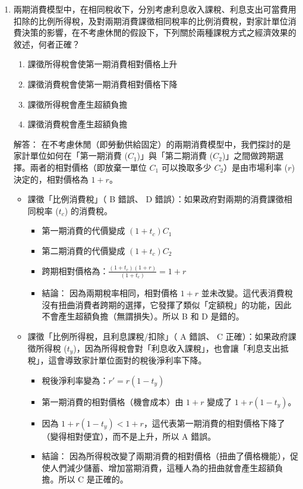 \documentclass[12pt, a4paper]{article}
\begin{document}
\begin{enumerate}
    \item 兩期消費模型中，在相同稅收下，分別考慮利息收入課稅、利息支出可當費用扣除的比例所得稅，及對兩期消費課徵相同稅率的比例消費稅，對家計單位消費決策的影響，在不考慮休閒的假設下，下列關於兩種課稅方式之經濟效果的敘述，何者正確？
    \begin{enumerate}[label=\Alph*.]
        \item 課徵所得稅會使第一期消費相對價格上升
        \item 課徵消費稅會使第一期消費相對價格下降
        \item 課徵所得稅會產生超額負擔
        \item 課徵消費稅會產生超額負擔
    \end{enumerate}
    解答：
    在不考慮休閒（即勞動供給固定）的兩期消費模型中，我們探討的是家計單位如何在「第一期消費 (\(C_1\))」與「第二期消費 (\(C_2\))」之間做跨期選擇。兩者的相對價格（即放棄一單位 \(C_1\) 可以換取多少 \(C_2\)）是由市場利率 (\(r\)) 決定的，相對價格為 \(1 + r\)。
    \begin{itemize}
        \item 課徵「比例消費稅」（ B 錯誤、 D 錯誤）：如果政府對兩期的消費課徵相同稅率 (\(t_c\)) 的消費稅。
        \begin{itemize}
            \item 第一期消費的代價變成 \((1+t_c)C_1\)
            \item 第二期消費的代價變成 \((1+t_c)C_2\)
            \item 跨期相對價格為：\(\frac{(1+t_c)(1+r)}{(1+t_c)} = 1+r\)
            \item 結論： 因為兩期稅率相同，相對價格 \(1+r\) 並未改變。這代表消費稅沒有扭曲消費者跨期的選擇，它發揮了類似「定額稅」的功能，因此不會產生超額負擔（無謂損失）。所以 B 和 D 是錯的。
        \end{itemize}
        \item 課徵「比例所得稅，且利息課稅/扣除」（ A 錯誤、 C 正確）：如果政府課徵所得稅 (\(t_y\))，因為所得稅會對「利息收入課稅」，也會讓「利息支出抵稅」，這會導致家計單位面對的稅後淨利率下降。
        \begin{itemize}
            \item 稅後淨利率變為：\(r' = r(1-t_y)\)
            \item 第一期消費的相對價格（機會成本）由 \(1+r\) 變成了 \(1 + r(1-t_y)\)。
            \item 因為 \(1 + r(1-t_y) < 1+r\)，這代表第一期消費的相對價格下降了（變得相對便宜），而不是上升，所以 A 錯誤。
            \item 結論： 因為所得稅改變了兩期消費的相對價格（扭曲了價格機能），促使人們減少儲蓄、增加當期消費，這種人為的扭曲就會產生超額負擔。所以 C 是正確的。
        \end{itemize}
    \end{itemize}


\end{enumerate}
\end{document}
